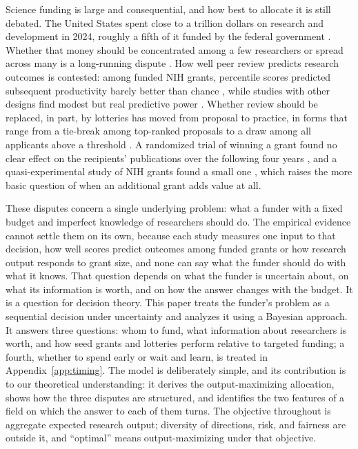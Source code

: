 \documentclass[article, 11pt, reqno]{amsart}
\theoremstyle{named}
\begin{document}
Science funding is large and consequential, and how best to allocate it is still debated. The United States spent close to a trillion dollars on research and development in 2024, roughly a fifth of it funded by the federal government \citep{NCSES2026, NSB2026}. Whether that money should be concentrated among a few researchers or spread across many is a long-running dispute \citep{FortinCurrie2013, Mongeon2016, Aagaard2020, Lauer2021}. How well peer review predicts research outcomes is contested: among funded NIH grants, percentile scores predicted subsequent productivity barely better than chance \citep{Fang2016}, while studies with other designs find modest but real predictive power \citep{Gallo2014, LiAgha2015, ParkLeeKim2015}. %
Whether review should be replaced, in part, by lotteries has moved from proposal to practice, in forms that range from a tie-break among top-ranked proposals to a draw among all applicants above a threshold \citep{Roumbanis2019, Heyard2022, Feliciani2024}. %
A randomized trial of winning a grant found no clear effect on the recipients' publications over the following four years \citep{Barnett2024}, and a quasi-experimental study of NIH grants found a small one \citep{JacobLefgren2011}, which raises the more basic question of when an additional grant adds value at all.

These disputes concern a single underlying problem: what a funder with a fixed budget and imperfect knowledge of researchers should do. The empirical evidence cannot settle them on its own, because each study measures one input to that decision, how well scores predict outcomes among funded grants or how research output responds to grant size, and none can say what the funder should do with what it knows. That question depends on what the funder is uncertain about, on what its information is worth, and on how the answer changes with the budget. It is a question for decision theory. This paper treats the funder's problem as a sequential decision under uncertainty and analyzes it using a Bayesian approach. It answers three questions: whom to fund, what information about researchers is worth, and how seed grants and lotteries perform relative to targeted funding; a fourth, whether to spend early or wait and learn, is treated in Appendix~\ref{app:timing}. The model is deliberately simple, and its contribution is to our theoretical understanding: it derives the output-maximizing allocation, shows how the three disputes are structured, and identifies the two features of a field on which the answer to each of them turns. The objective throughout is aggregate expected research output; diversity of directions, risk, and fairness are outside it, and ``optimal'' means output-maximizing under that objective.
\end{document}
